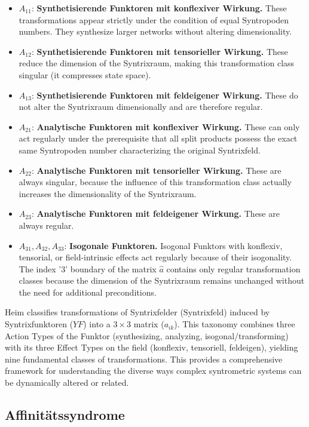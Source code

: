 \documentclass[12pt]{article}
\newcommand{\syntrixfeld}{\text{Syntrixfeld}}
\newcommand{\syntrixfunktor}{YF}
\begin{document}
\begin{itemize}
    \item \( A_{11} \): \textbf{Synthetisierende Funktoren mit konflexiver Wirkung.} These transformations appear strictly under the condition of equal Syntropoden numbers. They synthesize larger networks without altering dimensionality.
    \item \( A_{12} \): \textbf{Synthetisierende Funktoren mit tensorieller Wirkung.} These reduce the dimension of the Syntrixraum, making this transformation class singular (it compresses state space).
    \item \( A_{13} \): \textbf{Synthetisierende Funktoren mit feldeigener Wirkung.} These do not alter the Syntrixraum dimensionally and are therefore regular.
    \item \( A_{21} \): \textbf{Analytische Funktoren mit konflexiver Wirkung.} These can only act regularly under the prerequisite that all split products possess the exact same Syntropoden number characterizing the original Syntrixfeld.
    \item \( A_{22} \): \textbf{Analytische Funktoren mit tensorieller Wirkung.} These are always singular, because the influence of this transformation class actually increases the dimensionality of the Syntrixraum.
    \item \( A_{23} \): \textbf{Analytische Funktoren mit feldeigener Wirkung.} These are always regular.
    \item \( A_{31}, A_{32}, A_{33} \): \textbf{Isogonale Funktoren.} Isogonal Funktors with konflexiv, tensorial, or field-intrinsic effects act regularly because of their isogonality. The index '3' boundary of the matrix \( \hat{a} \) contains only regular transformation classes because the dimension of the Syntrixraum remains unchanged without the need for additional preconditions.
\end{itemize}

Heim classifies transformations of Syntrixfelder (\(\syntrixfeld\)) induced by Syntrixfunktoren (\(\syntrixfunktor\)) into a \(3 \times 3\) matrix (\(a_{ik}\)). This taxonomy combines three Action Types of the Funktor (synthesizing, analyzing, isogonal/transforming) with its three Effect Types on the field (konflexiv, tensoriell, feldeigen), yielding nine fundamental classes of transformations. This provides a comprehensive framework for understanding the diverse ways complex syntrometric systems can be dynamically altered or related.

\subsection{Affinitätssyndrome}
\label{sec:affinitaetssyndrome}
\end{document}
